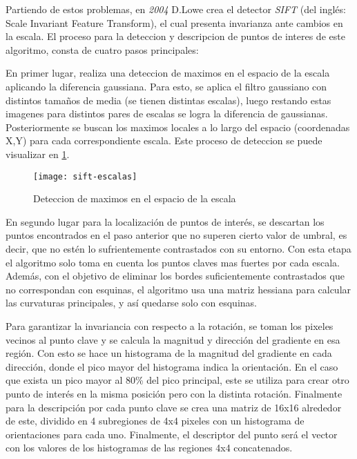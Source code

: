 Partiendo de estos problemas, en \textit{2004} D.Lowe crea el detector \textit{SIFT} (del inglés: Scale Invariant Feature Transform), el cual presenta invarianza ante cambios en la escala. El proceso para la deteccion y descripcion de puntos de interes de este algoritmo, consta de cuatro pasos principales:

En primer lugar, realiza una deteccion de maximos en el espacio de la escala aplicando la diferencia gaussiana. Para esto, se aplica el filtro gaussiano con distintos tamaños de media (se tienen distintas escalas), luego restando estas imagenes para distintos pares de escalas se logra la diferencia de gaussianas. Posteriormente se buscan los maximos locales a lo largo del espacio (coordenadas X,Y) para cada correspondiente escala. Este proceso de deteccion se puede visualizar en  \ref{imagen:sift-escalas}.

\begin{figure}[H]
	\centering
	\texttt{[image: sift-escalas]}
	\caption[SIFT - Espacio de escalas]{Deteccion de maximos en el espacio de la escala}
	\label{imagen:sift-escalas}
\end{figure}

En segundo lugar para la localización de puntos de interés, se descartan los puntos encontrados en el paso anterior que no superen cierto valor de umbral, es decir, que no estén lo sufrientemente contrastados con su entorno. Con esta etapa el algoritmo solo toma en cuenta los puntos claves mas fuertes por cada escala. Además, con el objetivo de eliminar los bordes suficientemente contrastados que no correspondan con esquinas, el algoritmo usa una matriz hessiana para calcular las curvaturas principales, y así quedarse solo con esquinas.

Para garantizar la invariancia con respecto a la rotación, se toman los pixeles vecinos al punto clave y se calcula la magnitud y dirección del gradiente en esa región. Con esto se hace un histograma de la magnitud del gradiente en cada dirección, donde el pico mayor del histograma indica la orientación. En el caso que exista un pico mayor al 80\% del pico principal, este se utiliza para crear otro punto de interés en la misma posición pero con la distinta rotación.
Finalmente para la descripción por cada punto clave se crea una matriz de 16x16 alrededor de este, dividido en 4 subregiones de 4x4 pixeles con un histograma de orientaciones para cada uno. Finalmente, el descriptor del punto será el vector con los valores de los histogramas de las regiones 4x4 concatenados.

